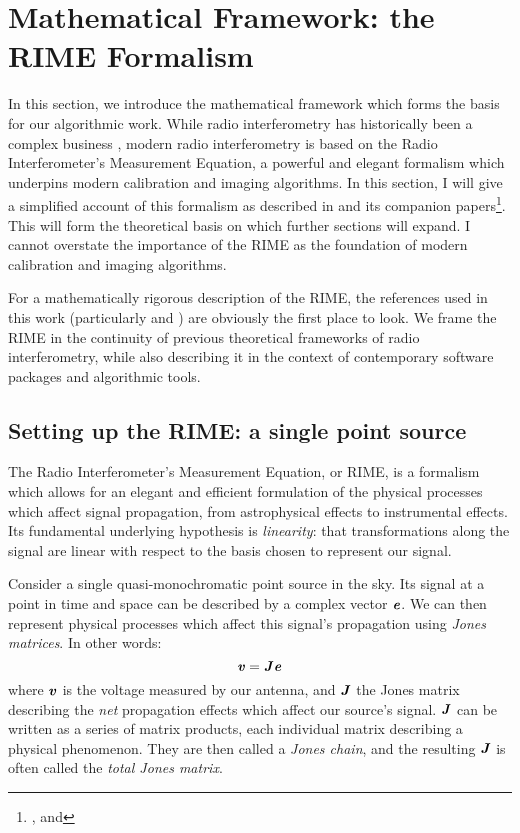 
\chapter{Mathematical Framework: the RIME Formalism}
\pg
In this section, we introduce the mathematical framework which forms the basis for our algorithmic work.
\label{section.RIME}
While radio interferometry has historically been a complex business , modern radio interferometry is based on the Radio Interferometer's Measurement Equation, a powerful and elegant formalism which underpins modern calibration and imaging algorithms. In this section, I will give a simplified account of this formalism as described in  and its companion papers\footnote{,  and }. This will form the theoretical basis on which further sections will expand. I cannot overstate the importance of the RIME as the foundation of modern calibration and imaging algorithms.

\pg
For a mathematically rigorous description of the RIME, the references used in this work (particularly  and ) are obviously the first place to look. We frame the RIME in the continuity of previous theoretical frameworks of radio interferometry, while also describing it in the context of contemporary software packages and algorithmic tools.

\section{Setting up the RIME: a single point source}
\label{section.RIME.setup}

\pg
The Radio Interferometer's Measurement Equation, or RIME, is a formalism which allows for an elegant and efficient formulation of the physical processes which affect signal propagation, from astrophysical effects to instrumental effects. Its fundamental underlying hypothesis is \emph{linearity}: that transformations along the signal are linear with respect to the basis chosen to represent our signal.

\pg
Consider a single quasi-monochromatic point source in the sky. Its signal at a point in time and space can be described by a complex vector $\evector$. We can then represent physical processes which affect this signal's propagation using \emph{Jones matrices}. In other words:
\begin{equation}
\volt = \Jones\evector
\end{equation}
where $\volt$ is the voltage measured by our antenna, and $\Jones$ the Jones matrix describing the \emph{net} propagation effects which affect our source's signal. $\Jones$ can be written as a series of matrix products, each individual matrix describing a physical phenomenon. They are then called a \emph{Jones chain}, and the resulting $\Jones$ is often called the \emph{total Jones matrix}.

